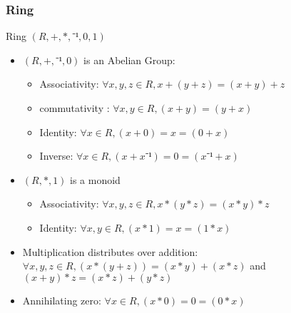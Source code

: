 \documentclass[xcolor={dvipsnames}]{beamer}
\begin{document}
  \begin{frame}[fragile]
    \frametitle{Ring}  
    Ring $(R,+,*,⁻¹,0,1)$
        \begin{itemize}
            \item $(R,+,⁻¹,0)$ is an Abelian Group:
             \begin{itemize}
              \item Associativity: $\forall x,y,z \in R, x + (y + z) = (x + y) + z$
              \item commutativity : $\forall x,y \in R, (x + y) = (y + x)$
              \item Identity: $\forall x \in R, (x + 0) = x = (0 + x)$
              \item Inverse: $\forall x \in R, (x + x⁻¹) = 0 = (x⁻¹ + x)$
            \end{itemize}
            \item $(R,*,1)$ is a monoid
            \begin{itemize}
              \item Associativity: $\forall x,y,z \in R, x * (y * z) = (x * y) * z$
              \item Identity: $\forall x,y \in R, (x * 1) = x = (1 * x)$
            \end{itemize}
            \item Multiplication distributes over addition: \(\forall x , y , z \in R, (x * (y + z)) = (x * y) + (x
            * z)\) and \( (x + y) * z = (x * z) + (y * z) \)
            \item Annihilating zero: \(\forall x \in R, (x * 0) = 0 = (0 * x)\)
          \end{itemize}
  \end{frame}
\end{document}
